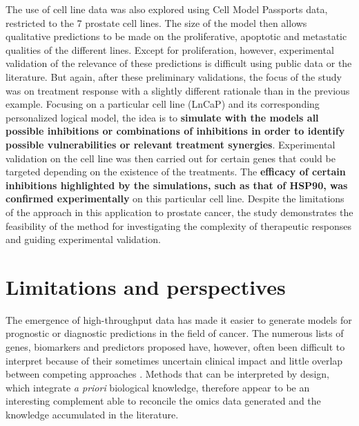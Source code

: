 \documentclass[a4paper,12pt,twoside,onecolumn,openright,final,oldfontcommands]{memoir}
\begin{document}
The use of cell line data was also explored using Cell Model Passports
data, restricted to the 7 prostate cell lines. The size of the model
then allows qualitative predictions to be made on the proliferative,
apoptotic and metastatic qualities of the different lines. Except for
proliferation, however, experimental validation of the relevance of
these predictions is difficult using public data or the literature. But
again, after these preliminary validations, the focus of the study was
on treatment response with a slightly different rationale than in the
previous example. Focusing on a particular cell line (LnCaP) and its
corresponding personalized logical model, the idea is to
\textbf{simulate with the models all possible inhibitions or
combinations of inhibitions in order to identify possible
vulnerabilities or relevant treatment synergies}. Experimental
validation on the cell line was then carried out for certain genes that
could be targeted depending on the existence of the treatments. The
\textbf{efficacy of certain inhibitions highlighted by the simulations,
such as that of HSP90, was confirmed experimentally} on this particular
cell line. Despite the limitations of the approach in this application
to prostate cancer, the study demonstrates the feasibility of the method
for investigating the complexity of therapeutic responses and guiding
experimental validation.

\section{Limitations and
perspectives}\label{limitations-and-perspectives}

The emergence of high-throughput data has made it easier to generate
models for prognostic or diagnostic predictions in the field of cancer.
The numerous lists of genes, biomarkers and predictors proposed have,
however, often been difficult to interpret because of their sometimes
uncertain clinical impact and little overlap between competing
approaches \citep{domany2014using}. Methods that can be interpreted by
design, which integrate \emph{a priori} biological knowledge, therefore
appear to be an interesting complement able to reconcile the omics data
generated and the knowledge accumulated in the literature.
\end{document}
